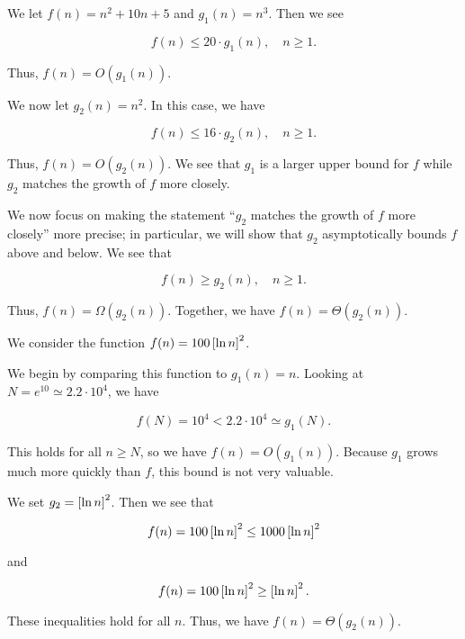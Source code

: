 \begin{example}
We let $f(n) = n^{2} + 10n + 5$ and $g_{1}(n) = n^{3}$.
Then we see

\begin{equation}
    f(n) \le 20\cdot g_{1}(n), \quad n\ge1.
\end{equation}

\noindent
Thus, $f(n) = O(g_{1}(n))$.

We now let $g_{2}(n) = n^{2}$.
In this case, we have

\begin{equation}
    f(n) \le 16\cdot g_{2}(n), \quad n\ge1.
\end{equation}

\noindent
Thus, $f(n) = O(g_{2}(n))$.
We see that $g_{1}$ is a larger upper bound for $f$ while $g_{2}$ matches
the growth of $f$ more closely.

We now focus on making the statement ``$g_{2}$ matches the growth
of $f$ more closely'' more precise;
in particular, we will show that $g_{2}$ asymptotically bounds $f$
above and below.
We see that

\begin{equation}
    f(n) \ge g_{2}(n), \quad n\ge1.
\end{equation}

\noindent
Thus, $f(n) = \Omega(g_{2}(n))$.
Together, we have $f(n) = \Theta(g_{2}(n))$.
\end{example}

\begin{example}
We consider the function $f(n) = 100\left[ \ln n \right]^{2}$.

We begin by comparing this function to $g_{1}(n) = n$.
Looking at $N = e^{10}\simeq 2.2\cdot10^{4}$, we have

\begin{equation}
    f(N) = 10^{4} < 2.2\cdot10^{4} \simeq g_{1}(N).
\end{equation}

\noindent
This holds for all $n\ge N$, so we have $f(n) = O(g_{1}(n))$.
Because $g_{1}$ grows much more quickly than $f$,
this bound is not very valuable.

We set $g_{2} = \left[ \ln n \right]^{2}$.
Then we see that

\begin{equation}
    f(n) = 100\left[ \ln n \right]^{2} \le 1000\left[ \ln n \right]^{2}
\end{equation}

\noindent
and

\begin{equation}
    f(n) = 100\left[ \ln n \right]^{2} \ge \left[ \ln n \right]^{2}.
\end{equation}

\noindent
These inequalities hold for all $n$.
Thus, we have $f(n) = \Theta(g_{2}(n))$.
\end{example}

